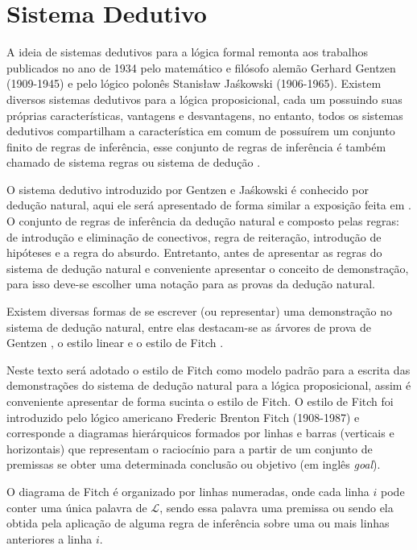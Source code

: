 \section{Sistema Dedutivo}\label{sec:SistemaDedutivo}

A ideia de sistemas dedutivos para a lógica formal remonta aos trabalhos publicados no ano de 1934 pelo matemático e filósofo alemão Gerhard Gentzen (1909-1945) e pelo lógico polonês Stanisław Jaśkowski (1906-1965). Existem diversos sistemas dedutivos para a lógica proposicional, cada um possuindo suas próprias características, vantagens e desvantagens, no entanto, todos os sistemas dedutivos compartilham a característica em comum de possuírem um conjunto finito de regras de inferência, esse conjunto de regras de inferência é também chamado de sistema regras ou sistema de dedução \cite{edgar2002}.

O sistema dedutivo introduzido por Gentzen e Jaśkowski é conhecido por dedução natural, aqui ele será apresentado de forma similar a exposição feita em \cite{joaoPavao2014}. O conjunto de regras de inferência da dedução natural e composto pelas regras: de introdução e eliminação de conectivos, regra de reiteração, introdução de hipóteses e a regra do absurdo. Entretanto, antes de apresentar as regras do sistema de dedução natural e conveniente apresentar o conceito de demonstração, para isso deve-se escolher uma notação para as provas da dedução natural.

Existem diversas formas de se escrever (ou representar) uma demonstração no sistema de dedução natural, entre elas destacam-se as árvores de prova de Gentzen \cite{benja-Logica}, o estilo linear \cite{copi1981, mortari2001} e o estilo de Fitch \cite{fitch1953, joaoPavao2014}. 

Neste texto será adotado o estilo de Fitch como modelo padrão para a escrita das demonstrações do sistema de dedução natural para a lógica proposicional, assim é conveniente apresentar de forma sucinta o estilo de Fitch. O estilo de Fitch foi introduzido pelo lógico americano Frederic Brenton Fitch (1908-1987) e corresponde a diagramas hierárquicos formados por linhas e barras (verticais e horizontais) que representam o raciocínio para a partir de um conjunto de premissas se obter uma determinada conclusão ou objetivo (em inglês \textit{goal}).

O diagrama de Fitch é organizado por linhas numeradas, onde cada linha $i$ pode conter uma única palavra de $\mathcal{L}$, sendo essa palavra uma premissa ou sendo ela obtida pela aplicação de alguma regra de inferência sobre uma ou mais linhas anteriores a linha $i$. 

